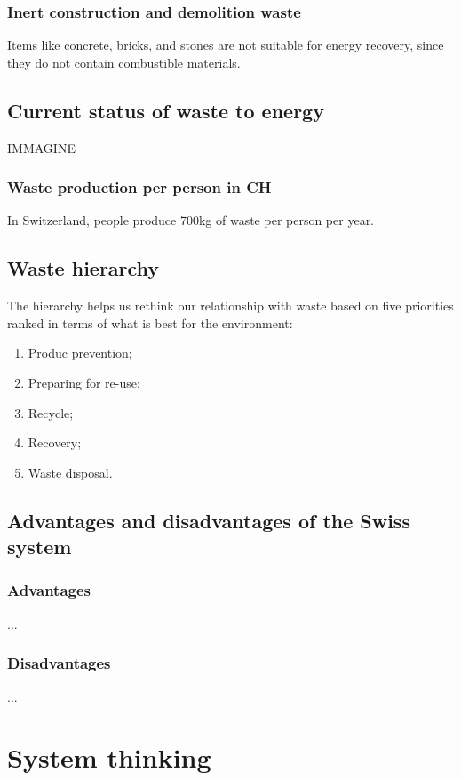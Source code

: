 \documentclass{article}
\begin{document}
\subsubsection{Inert construction and demolition waste}
Items like concrete, bricks, and stones are not suitable for energy recovery,
since they do not contain combustible materials.

\newpage
\subsection{Current status of waste to energy}
IMMAGINE    

\subsubsection{Waste production per person in CH}
In Switzerland, people produce 700kg of waste per person per year.

\subsection{Waste hierarchy}
The hierarchy helps us rethink our relationship with waste based on
five priorities ranked in terms of what is best for the environment:

\begin{enumerate}
    \item Produc prevention;
    \item Preparing for re-use;
    \item Recycle;
    \item Recovery;
    \item Waste disposal.
\end{enumerate}

\subsection{Advantages and disadvantages of the Swiss system}
\subsubsection{Advantages}
...

\subsubsection{Disadvantages}
...

\section{System thinking}
\end{document}

